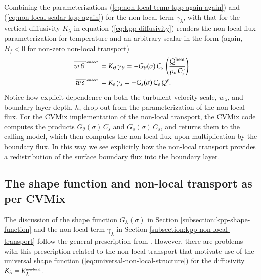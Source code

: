 Combining the parameterizations
(\ref{eq:non-local-temp-kpp-again-again}) and
(\ref{eq:non-local-scalar-kpp-again}) for the non-local term
$\gamma_{\lambda}$, with that for the vertical diffusivity
$K_{\lambda}$ in equation (\ref{eq:kpp-diffusivity}) renders the
non-local flux parameterization for temperature and an arbitrary
scalar in the form (again, $B_{f} < 0$ for non-zero non-local
transport)
\begin{subequations}
\begin{align}
\overline{w \, \theta}^{\mbox{\tiny non-local}} &= K_{\theta}  \, \gamma_{\theta}
  = 
 - G_{\theta}(\sigma) \, C_{s} \, \left( \frac{ Q^{\mbox{\scriptsize heat}}}{ \rho_{o}  \, C_{\mbox{\tiny p}}^{o} } \right)
\label{eq:non-local-flux-kpp-param-temp-again}
\\
\overline{w \, s}^{\mbox{\tiny non-local}} &= K_{s}  \, \gamma_{s}
  = 
 -G_{s}(\sigma) \, C_{s} \,  Q^{s}.
\label{eq:non-local-flux-kpp-param-scalar-again}
\end{align}
\end{subequations}
Notice how explicit dependence on both the turbulent velocity scale,
$w_{\lambda}$, and boundary layer depth, $h$, drop out from the
parameterization of the non-local flux.  For the CVMix implementation
of the non-local transport, the CVMix code computes the products
$G_{\theta}(\sigma) \, C_{s}$ and $G_{s}(\sigma) \, C_{s}$, and
returns them to the calling model, which then computes the non-local
flux upon multiplication by the boundary flux.  In this way we see
explicitly how the non-local transport provides a redistribution of
the surface boundary flux into the boundary layer.


\subsection{The shape function and non-local transport as per CVMix}
\label{subsection:kpp-shape-function-cvmix}

The discussion of the shape function $G_{\lambda}(\sigma)$ in Section
\ref{subsection:kpp-shape-function} and the non-local term
$\gamma_{\lambda}$ in Section \ref{subsection:kpp-non-local-transport}
follow the general prescription from \cite{LargeKPP}.  However, there
are problems with this prescription related to the non-local transport
that motivate use of the universal shape function
(\ref{eq:universal-non-local-structure}) for the diffusivity
$K_{\lambda} = K^{\mbox{\tiny non-local}}_{\lambda}$.



